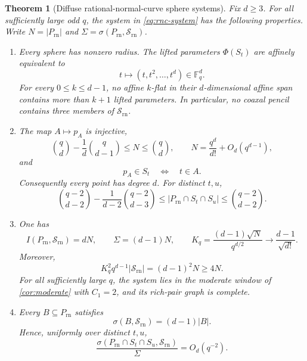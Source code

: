 \documentclass[10pt,a4paper]{amsart}
\newtheorem{theorem}{Theorem}
\begin{document}
\begin{theorem}[Diffuse rational-normal-curve sphere systems]\label{thm:rnc-system}
Fix $d\ge3$.  For all sufficiently large odd $q$, the system in \eqref{eq:rnc-system} has the following properties.  Write $N=|P_{\mathrm{rn}}|$ and $\Sigma=\sigma(P_{\mathrm{rn}},\mathcal S_{\mathrm{rn}})$.
\begin{enumerate}[label=\textup{(\arabic*)}]
\item Every sphere has nonzero radius.  The lifted parameters $\Phi(S_t)$ are affinely equivalent to
\[
 t\longmapsto(t,t^2,\ldots,t^d)\in\mathbb F_q^d.
\]
For every $0\le k\le d-1$, no affine $k$-flat in their $d$-dimensional affine span contains more than $k+1$ lifted parameters.  In particular, no coaxal pencil contains three members of $\mathcal S_{\mathrm{rn}}$.
\item The map $A\mapsto p_A$ is injective,
\begin{equation}\label{eq:rnc-N-bounds}
 \binom qd-\frac1d\binom q{d-1}
 \le N\le\binom qd,
 \qquad
 N=\frac{q^d}{d!}+O_d(q^{d-1}),
\end{equation}
and
\begin{equation}\label{eq:rnc-incidence}
 p_A\in S_t\quad\Longleftrightarrow\quad t\in A.
\end{equation}
Consequently every point has degree $d$.  For distinct $t,u$,
\begin{equation}\label{eq:rnc-pair-count}
 \binom{q-2}{d-2}-\frac1{d-2}\binom{q-2}{d-3}
 \le |P_{\mathrm{rn}}\cap S_t\cap S_u|
 \le\binom{q-2}{d-2}.
\end{equation}
\item One has
\begin{equation}\label{eq:rnc-surplus}
 I(P_{\mathrm{rn}},\mathcal S_{\mathrm{rn}})=dN,
 \qquad
 \Sigma=(d-1)N,
 \qquad
 K_q=\frac{(d-1)\sqrt N}{q^{d/2}}
 \longrightarrow\frac{d-1}{\sqrt{d!}}.
\end{equation}
Moreover,
\begin{equation}\label{eq:rnc-lower-exact}
 K_q^2q^{d-1}|\mathcal S_{\mathrm{rn}}|=(d-1)^2N\ge4N.
\end{equation}
For all sufficiently large $q$, the system lies in the moderate window of \cref{cor:moderate} with $C_1=2$, and its rich-pair graph is complete.
\item Every $B\subseteq P_{\mathrm{rn}}$ satisfies
\begin{equation}\label{eq:rnc-uniform-excess}
 \sigma(B,\mathcal S_{\mathrm{rn}})=(d-1)|B|.
\end{equation}
Hence, uniformly over distinct $t,u$,
\begin{equation}\label{eq:rnc-no-atom}
 \frac{\sigma(P_{\mathrm{rn}}\cap S_t\cap S_u,\mathcal S_{\mathrm{rn}})}{\Sigma}
 =O_d(q^{-2}).
\end{equation}
\end{enumerate}
\end{theorem}
\end{document}
